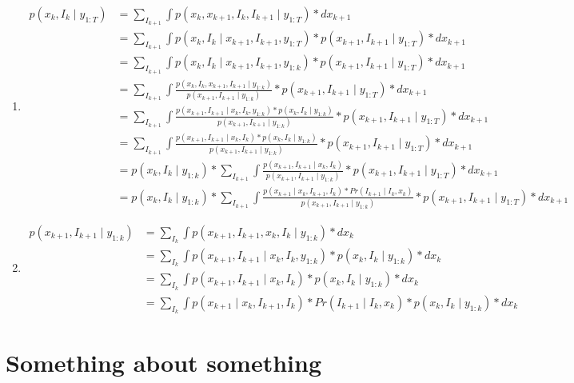 \documentclass[times, twoside, watermark]{zHenriquesLab-StyleBioRxiv}
\begin{document}
\begin{enumerate}
\item
$$
\begin{align*}
p(x_{k}, I_{k} \mid y_{1:T}) &= \sum_{I_{k+1}} \int p(x_{k}, x_{k+1}, I_{k}, I_{k+1} \mid y_{1:T}) * dx_{k+1}
\\ &= \sum_{I_{k+1}} \int p(x_{k}, I_{k} \mid x_{k+1}, I_{k+1}, y_{1:T}) * p(x_{k+1}, I_{k+1} \mid y_{1:T}) * dx_{k+1}
\\ &= \sum_{I_{k+1}} \int p(x_{k}, I_{k} \mid x_{k+1}, I_{k+1}, y_{1:k}) * p(x_{k+1}, I_{k+1} \mid y_{1:T}) * dx_{k+1}
\\ &= \sum_{I_{k+1}} \int \frac{p(x_{k}, I_{k}, x_{k+1}, I_{k+1} \mid y_{1:k})}{p(x_{k+1}, I_{k+1} \mid y_{1:k})} * p(x_{k+1}, I_{k+1} \mid y_{1:T}) * dx_{k+1}
\\ &= \sum_{I_{k+1}} \int \frac{p(x_{k+1}, I_{k+1} \mid x_{k}, I_{k}, y_{1:k}) * p(x_{k}, I_{k} \mid y_{1:k})}{p(x_{k+1}, I_{k+1} \mid y_{1:k})} * p(x_{k+1}, I_{k+1} \mid y_{1:T}) * dx_{k+1} 
\\ &= \sum_{I_{k+1}} \int \frac{p(x_{k+1}, I_{k+1} \mid x_{k}, I_{k}) * p(x_{k}, I_{k} \mid y_{1:k})}{p(x_{k+1}, I_{k+1} \mid y_{1:k})} * p(x_{k+1}, I_{k+1} \mid y_{1:T}) * dx_{k+1}
\\ &= p(x_{k}, I_{k} \mid y_{1:k}) * \sum_{I_{k+1}} \int \frac{p(x_{k+1}, I_{k+1} \mid x_{k}, I_{k})}{p(x_{k+1}, I_{k+1} \mid y_{1:k})} * p(x_{k+1}, I_{k+1} \mid y_{1:T}) * dx_{k+1} 
\\ &= p(x_{k}, I_{k} \mid y_{1:k}) * \sum_{I_{k+1}} \int \frac{p(x_{k+1} \mid x_{k}, I_{k+1}, I_{k}) * Pr(I_{k+1} \mid I_{k}, x_{k})}{p(x_{k+1}, I_{k+1} \mid y_{1:k})} * p(x_{k+1}, I_{k+1} \mid y_{1:T}) * dx_{k+1}
\end{align*}$$

\item
$$
\begin{align*}
p(x_{k+1}, I_{k+1} \mid y_{1:k}) &= \sum_{I_{k}} \int p(x_{k+1}, I_{k+1}, x_{k}, I_{k} \mid y_{1:k}) * dx_{k}
\\ &= \sum_{I_{k}} \int p(x_{k+1}, I_{k+1} \mid x_{k}, I_{k}, y_{1:k}) * p(x_{k}, I_{k} \mid y_{1:k}) * dx_{k}
\\ &= \sum_{I_{k}} \int p(x_{k+1}, I_{k+1} \mid x_{k}, I_{k}) * p(x_{k}, I_{k} \mid y_{1:k}) * dx_{k}
\\ &= \sum_{I_{k}} \int p(x_{k+1} \mid x_{k}, I_{k+1}, I_{k}) * Pr(I_{k+1} \mid I_{k}, x_{k}) * p(x_{k}, I_{k} \mid y_{1:k}) * dx_{k}
\end{align*}$$

\end{enumerate}

\newpage

\captionsetup*{format=largeformat}
\section{Something about something} \label{note:Note1} 
\Blindtext

\end{document}
